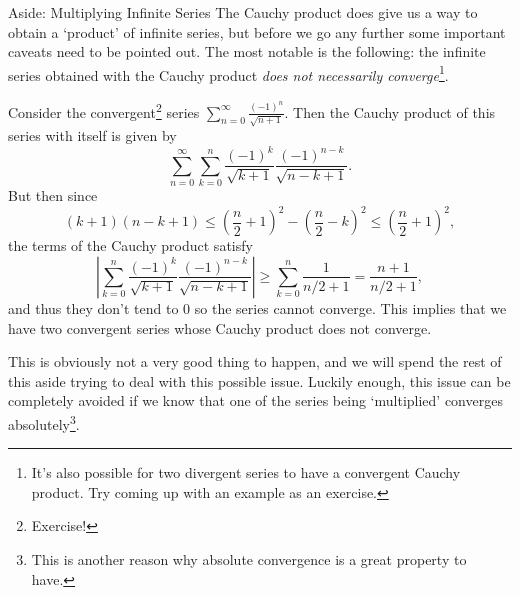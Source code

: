 \begin{aside}{Aside: Multiplying Infinite Series}
The Cauchy product does give us a way to obtain a `product' of infinite series, but before we go any further some important caveats need to be pointed out. The most notable is the following: the infinite series obtained with the Cauchy product \emph{does not necessarily converge}\footnote{It's also possible for two divergent series to have a convergent Cauchy product. Try coming up with an example as an exercise.}.

\begin{example*}
	Consider the convergent\footnote{Exercise!} series $\sum_{n = 0}^{\infty} \frac{(-1)^n}{\sqrt{n + 1}}$. Then the Cauchy product of this series with itself is given by
	$$
	\sum_{n = 0}^{\infty} \sum_{k = 0}^n \frac{(-1)^k}{\sqrt{k + 1}} \frac{(-1)^{n - k}}{\sqrt{n - k + 1}}.
	$$
	But then since
	$$
	(k + 1)(n - k + 1) \leq \left(\frac{n}{2} + 1\right)^2 - \left(\frac{n}{2} - k\right)^2 \leq \left(\frac{n}{2} + 1\right)^2,
	$$
	the terms of the Cauchy product satisfy
	$$
	\left|\sum_{k = 0}^n \frac{(-1)^k}{\sqrt{k + 1}} \frac{(-1)^{n - k}}{\sqrt{n - k + 1}}\right| \geq \sum_{k = 0}^n \frac{1}{n/2 + 1} = \frac{n + 1}{n/2 + 1},
	$$
	and thus they don't tend to 0 so the series cannot converge. This implies that we have two convergent series whose Cauchy product does not converge.
\end{example*}

	

This is obviously not a very good thing to happen, and we will spend the rest of this aside trying to deal with this possible issue.
Luckily enough, this issue can be completely avoided if we know that one of the series being `multiplied' converges absolutely\footnote{This is another reason why absolute convergence is a great property to have.}.


\end{aside}
